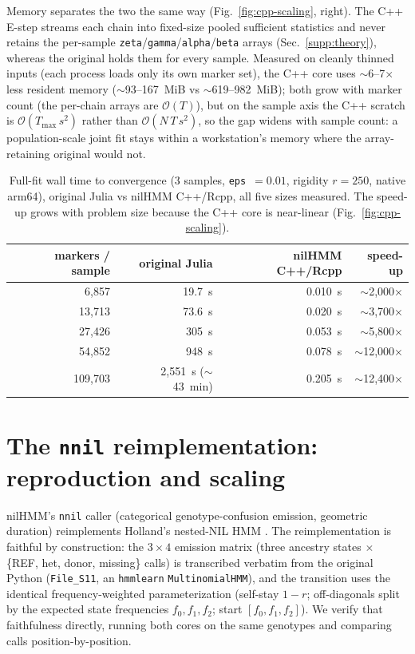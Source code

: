 \documentclass[11pt]{article}
\newcommand{\code}[1]{\texttt{#1}}
\newcommand{\bigO}{\mathcal{O}}
\providecommand{\nnil}{\texttt{nnil}\xspace}
\begin{document}
Memory separates the two the same way (Fig.~\ref{fig:cpp-scaling}, right). The C++
E-step streams each chain into fixed-size pooled sufficient statistics and never
retains the per-sample \code{zeta}/\code{gamma}/\code{alpha}/\code{beta} arrays
(Sec.~\ref{supp:theory}), whereas the original holds them for every sample. Measured
on cleanly thinned inputs (each process loads only its own marker set), the C++ core
uses $\sim$6--7$\times$ less resident memory ($\sim$93--167~MiB vs
$\sim$619--982~MiB); both grow with marker count (the per-chain arrays are
$\bigO(T)$), but on the sample axis the C++ scratch is $\bigO(T_{\max}\,s^2)$ rather
than $\bigO(N\,T\,s^2)$, so the gap widens with sample count: a population-scale
joint fit stays within a workstation's memory where the array-retaining original
would not.

\begin{table}[htbp]
\centering
\small
\begin{tabular}{@{}r r r r@{}}
\toprule
markers / sample & original Julia & nilHMM C++/Rcpp & speed-up \\
\midrule
6{,}857   & 19.7~s                   & 0.010~s & $\sim$2{,}000$\times$ \\
13{,}713  & 73.6~s                   & 0.020~s & $\sim$3{,}700$\times$ \\
27{,}426  & 305~s                    & 0.053~s & $\sim$5{,}800$\times$ \\
54{,}852  & 948~s                    & 0.078~s & $\sim$12{,}000$\times$ \\
109{,}703 & 2{,}551~s ($\sim$43~min) & 0.205~s & $\sim$12{,}400$\times$ \\
\bottomrule
\end{tabular}
\caption{Full-fit wall time to convergence (3 samples, \code{eps}~$=0.01$, rigidity
$r=250$, native arm64), original Julia vs nilHMM C++/Rcpp, all five sizes measured.
The speed-up grows with problem size because the C++ core is near-linear
(Fig.~\ref{fig:cpp-scaling}).}
\label{tab:cpp-speed}
\end{table}

\section{The \nnil reimplementation: reproduction and scaling}
\label{supp:nnil}
nilHMM's \nnil caller (categorical genotype-confusion emission, geometric
duration) reimplements Holland's nested-NIL HMM \citep{zhong2025}. The
reimplementation is faithful by construction: the $3\times4$ emission matrix (three
ancestry states $\times$ \{REF, het, donor, missing\} calls) is transcribed
verbatim from the original Python (\code{File\_S11}, an \code{hmmlearn}
\code{MultinomialHMM}), and the transition uses the identical frequency-weighted
parameterization (self-stay $1-r$; off-diagonals split by the expected state
frequencies $f_0, f_1, f_2$; start $[f_0, f_1, f_2]$). We verify that faithfulness
directly, running both cores on the same genotypes and comparing calls
position-by-position.
\end{document}

